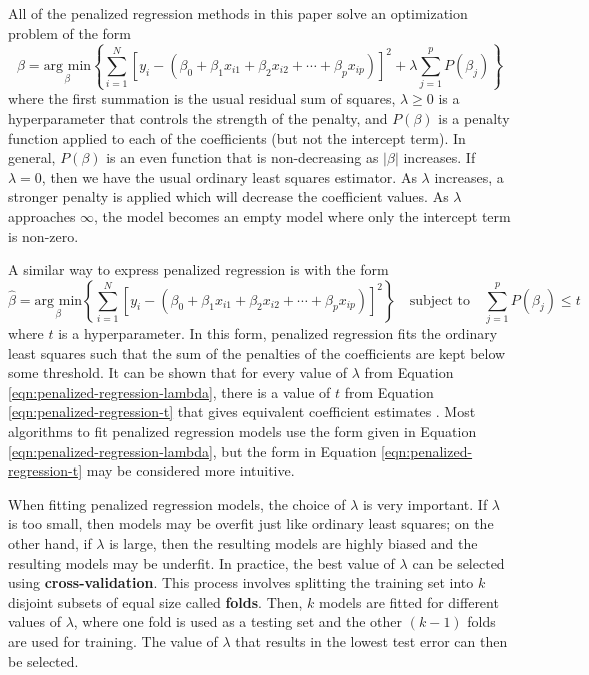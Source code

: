 \documentclass{article}
\newcommand{\argmin}[2]{\underset{#1}{\text{arg min}}\left\{#2\right\}}
\begin{document}
All of the penalized regression methods in this paper solve an optimization problem of the form
\begin{equation}\label{eqn:penalized-regression-lambda}
	\hat{\beta}=\argmin{\beta}{\sum\limits_{i = 1}^N[y_i - (\beta_0 + \beta_1 x_{i1} + \beta_2 x_{i2} + \cdots + \beta_p x_{ip})]^2 + \lambda\sum\limits_{j = 1}^p P(\beta_j)}
\end{equation}
where the first summation is the usual residual sum of squares, $\lambda\geq 0$ is a hyperparameter that controls the strength of the penalty, and $P(\beta)$ is a penalty function applied to each of the coefficients (but not the intercept term). In general, $P(\beta)$ is an even function that is non-decreasing as $\vert \beta \vert$ increases. If $\lambda = 0$, then we have the usual ordinary least squares estimator. As $\lambda$ increases, a stronger penalty is applied which will decrease the coefficient values. As $\lambda$ approaches $\infty$, the model becomes an empty model where only the intercept term is non-zero.

A similar way to express penalized regression is with the form
\begin{equation}\label{eqn:penalized-regression-t}
	\hat{\beta} = \argmin{\beta}{\sum\limits_{i = 1}^N[y_i - (\beta_0 + \beta_1 x_{i1} + \beta_2 x_{i2} + \cdots + \beta_p x_{ip})]^2} \quad \text{subject to} \quad \sum\limits_{j = 1}^p P(\beta_j)\leq t
\end{equation}
where $t$ is a hyperparameter. In this form, penalized regression fits the ordinary least squares such that the sum of the penalties of the coefficients are kept below some threshold. It can be shown that for every value of $\lambda$ from Equation \ref{eqn:penalized-regression-lambda}, there is a value of $t$ from Equation \ref{eqn:penalized-regression-t} that gives equivalent coefficient estimates \cite{james2013introduction}. Most algorithms to fit penalized regression models use the form given in Equation \ref{eqn:penalized-regression-lambda}, but the form in Equation \ref{eqn:penalized-regression-t} may be considered more intuitive.

When fitting penalized regression models, the choice of $\lambda$ is very important. If $\lambda$ is too small, then models may be overfit just like ordinary least squares; on the other hand, if $\lambda$ is large, then the resulting models are highly biased and the resulting models may be underfit. In practice, the best value of $\lambda$ can be selected using \textbf{cross-validation}. This process involves splitting the training set into $k$ disjoint subsets of equal size called \textbf{folds}. Then, $k$ models are fitted for different values of $\lambda$, where one fold is used as a testing set and the other $(k - 1)$ folds are used for training. The value of $\lambda$ that results in the lowest test error can then be selected.
\end{document}
